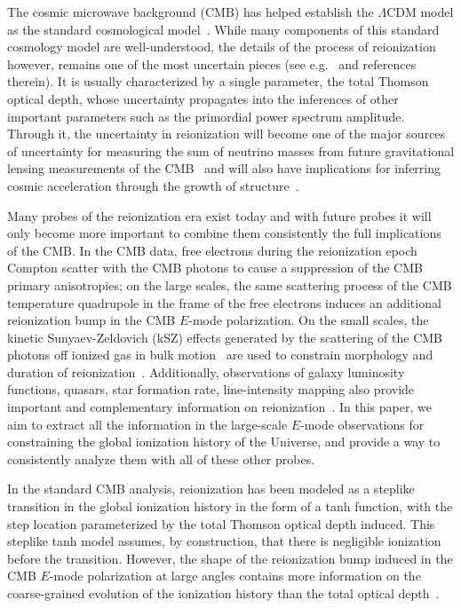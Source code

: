 \documentclass[aps,prd,twocolumn,amsmath,amssymb,showpacs,floatfix,superscriptaddress,nofootinbib]{revtex4-1}
\begin{document}
The cosmic microwave background (CMB) has helped establish the $\Lambda$CDM model as the standard cosmological model~\cite{Aghanim:2018eyx}. While many components of this standard cosmology model are well-understood, the details of the process of reionization however, remains one of the most uncertain pieces (see e.g.~\cite{2016ASSL..423.....M} and references therein).  It is usually characterized by a single parameter, the total Thomson optical depth, whose  uncertainty propagates into the inferences of other important parameters such as the primordial power spectrum amplitude. Through it, the uncertainty in reionization will become one of the major sources of uncertainty for measuring the sum of neutrino masses from future gravitational lensing measurements of the CMB~ \cite{Smith:2006nk, Allison:2015qca} and will also have implications for inferring cosmic acceleration through the growth of structure~\cite{Hu:2003pt}. 

Many probes of  the reionization era exist today and with future probes it will only become more important to combine them consistently the full implications of the CMB. In the CMB data, free electrons during the reionization epoch Compton scatter with the CMB photons to cause a suppression of the CMB primary anisotropies; on the large scales, the same scattering process of the CMB temperature quadrupole in the frame of the free electrons induces an additional reionization bump in the CMB $E$-mode polarization. On the small scales, the kinetic Sunyaev-Zeldovich (kSZ) effects generated by the scattering of the CMB photons off ionized gas in bulk motion~\cite{Sunyaev:1970er, Sunyaev:1980vz} are used to constrain morphology and duration of reionization~\cite{mcquinn_2005,mesinger_2012_kSZ}. Additionally, observations of galaxy luminosity functions, quasars, star formation rate, line-intensity mapping also provide important and complementary information on reionization~\cite{2016ASSL..423.....M}. In this paper, we aim to extract all the information in the large-scale $E$-mode observations for constraining the global ionization history of the Universe, and provide a way to consistently analyze them with all of these other probes.
 
In the standard CMB analysis, reionization has been  modeled as a steplike transition in the global ionization history in the form of a tanh function, with the step location parameterized by the total Thomson optical depth induced. This steplike tanh model assumes, by construction, that there is negligible ionization before the transition. However, the shape of the reionization bump induced in the CMB $E$-mode polarization at large angles contains more information on the coarse-grained evolution of the ionization history than the total optical depth~\cite{Hu:2003gh, Mortonson:2007hq}. 
\end{document}

